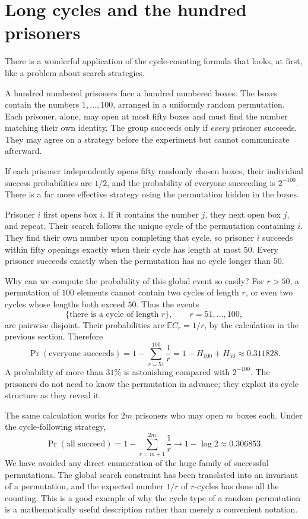\section{Long cycles and the hundred prisoners}

There is a wonderful application of the cycle-counting formula that looks, at first, like a problem about search strategies.

A hundred numbered prisoners face a hundred numbered boxes. The boxes contain the numbers \(1,\ldots,100\), arranged in a uniformly random permutation. Each prisoner, alone, may open at most fifty boxes and must find the number matching their own identity. The group succeeds only if \emph{every} prisoner succeeds. They may agree on a strategy before the experiment but cannot communicate afterward.

If each prisoner independently opens fifty randomly chosen boxes, their individual success probabilities are \(1/2\), and the probability of everyone succeeding is \(2^{-100}\). There is a far more effective strategy using the permutation hidden in the boxes.

Prisoner \(i\) first opens box \(i\). If it contains the number \(j\), they next open box \(j\), and repeat. Their search follows the unique cycle of the permutation containing \(i\). They find their own number upon completing that cycle, so prisoner \(i\) succeeds within fifty openings exactly when their cycle has length at most \(50\). Every prisoner succeeds exactly when the permutation has no cycle longer than \(50\).

Why can we compute the probability of this global event so easily? For \(r>50\), a permutation of \(100\) elements cannot contain two cycles of length \(r\), or even two cycles whose lengths both exceed \(50\). Thus the events
\[
 \{\text{there is a cycle of length }r\},
 \qquad r=51,\ldots,100,
\]
are pairwise disjoint. Their probabilities are \(\mathbb E C_r=1/r\), by the calculation in the previous section. Therefore
\[
 \boxed{
 \Pr(\text{everyone succeeds})
 =1-\sum_{r=51}^{100}\frac1r
 =1-H_{100}+H_{50}
 \approx0.311828.
 }
\]
A probability of more than \(31\%\) is astonishing compared with \(2^{-100}\). The prisoners do not need to know the permutation in advance; they exploit its cycle structure as they reveal it.

The same calculation works for \(2m\) prisoners who may open \(m\) boxes each. Under the cycle-following strategy,
\[
 \Pr(\text{all succeed})
 =1-\sum_{r=m+1}^{2m}\frac1r
 \longrightarrow1-\log2
 \approx0.306853.
\]
We have avoided any direct enumeration of the huge family of successful permutations. The global search constraint has been translated into an invariant of a permutation, and the expected number \(1/r\) of \(r\)-cycles has done all the counting. This is a good example of why the cycle type of a random permutation is a mathematically useful description rather than merely a convenient notation.


